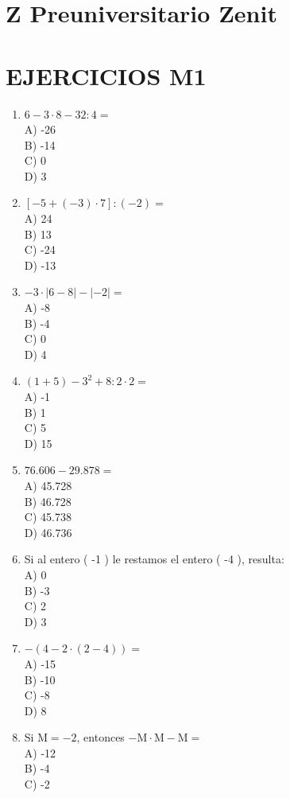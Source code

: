 \documentclass[10pt]{article}
\begin{document}
\section*{Z Preuniversitario Zenit}
\section*{EJERCICIOS M1}
\begin{enumerate}
  \item $6-3 \cdot 8-32: 4=$\\
A) -26\\
B) -14\\
C) 0\\
D) 3
  \item $[-5+(-3) \cdot 7]:(-2)=$\\
A) 24\\
B) 13\\
C) -24\\
D) -13
  \item $-3 \cdot|6-8|-|-2|=$\\
A) -8\\
B) -4\\
C) 0\\
D) 4
  \item $(1+5)-3^{2}+8: 2 \cdot 2=$\\
A) -1\\
B) 1\\
C) 5\\
D) 15
  \item $76.606-29.878=$\\
A) 45.728\\
B) 46.728\\
C) 45.738\\
D) 46.736
  \item Si al entero ( -1 ) le restamos el entero ( -4 ), resulta:\\
A) 0\\
B) -3\\
C) 2\\
D) 3
  \item $-(4-2 \cdot(2-4))=$\\
A) -15\\
B) -10\\
C) -8\\
D) 8
  \item Si $\mathrm{M}=-2$, entonces $-\mathrm{M} \cdot \mathrm{M}-\mathrm{M}=$\\
A) -12\\
B) -4\\
C) -2\\

\end{enumerate}
\end{document}

